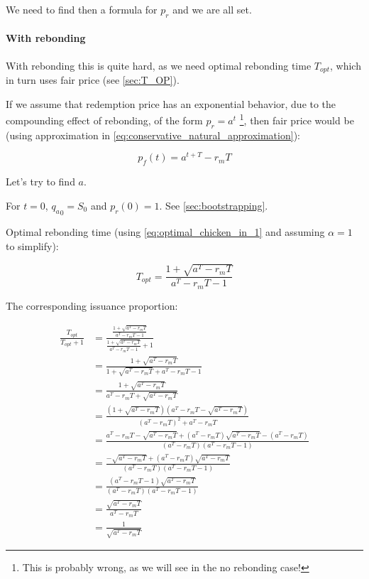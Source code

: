 \documentclass{article}
\begin{document}
We need to find then a formula for $p_r$ and we are all set.

\paragraph{With rebonding}
With rebonding this is quite hard, as we need optimal rebonding time $T_{opt}$, which in turn uses fair price (see \ref{sec:T_OP}).

If we assume that redemption price has an exponential behavior, due to the compounding effect of rebonding, of the form $p_r = a^t$ \footnote{This is probably wrong, as we will see in the no rebonding case!}, then fair price would be (using approximation in \ref{eq:conservative_natural_approximation}):

\begin{equation}
  \label{eq:conservative-2}
p_f(t) = a^{t+T} - r_m T
\end{equation}

Let’s try to find $a$.

For $t=0$, ${q_a}_0 = S_0$ and $p_r(0) = 1$. See \ref{sec:bootstrapping}.

Optimal rebonding time (using \ref{eq:optimal_chicken_in_1} and assuming $\alpha = 1$ to simplify):

\begin{equation}
  \label{eq:conservative_T_OP}
T_{opt} = \frac{1+ \sqrt{a^T - r_mT}}{a^T - r_mT - 1}
\end{equation}

The corresponding issuance proportion:

\begin{equation}
  \label{eq:conservative_issuance_proportion}
  \begin{split}
  \frac{T_{opt}}{T_{opt} + 1} & = \frac{\frac{1+ \sqrt{a^T - r_mT}}{a^T - r_mT - 1}}{\frac{1+ \sqrt{a^T - r_mT}}{a^T - r_mT - 1} + 1} \\
  & = \frac{1+ \sqrt{a^T - r_mT}}{1+ \sqrt{a^T - r_mT} + a^T - r_mT - 1} \\
  & = \frac{1+ \sqrt{a^T - r_mT}}{a^T - r_mT + \sqrt{a^T - r_mT}} \\
  & = \frac{(1+ \sqrt{a^T - r_mT})(a^T - r_mT - \sqrt{a^T - r_mT})}{(a^T - r_mT)^2 + a^T - r_mT} \\
  & = \frac{a^T - r_mT - \sqrt{a^T - r_mT} + (a^T - r_mT)\sqrt{a^T - r_mT} - (a^T - r_mT)}{(a^T - r_mT)(a^T - r_mT - 1)} \\
  & = \frac{- \sqrt{a^T - r_mT} + (a^T - r_mT)\sqrt{a^T - r_mT}}{(a^T - r_mT)(a^T - r_mT - 1)} \\
  & = \frac{(a^T - r_mT - 1)\sqrt{a^T - r_mT}}{(a^T - r_mT)(a^T - r_mT - 1)} \\
  & = \frac{\sqrt{a^T - r_mT}}{a^T - r_mT} \\
  & = \frac{1}{\sqrt{a^T - r_mT}}
  \end{split}
\end{equation}
\end{document}
